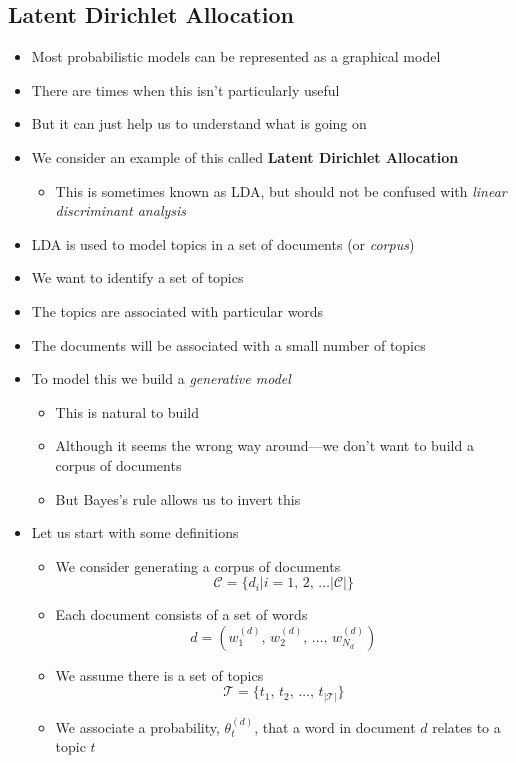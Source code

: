 \documentclass[11pt]{article}
\begin{document}
\subsection{Latent Dirichlet Allocation}
\label{sec:orga2ae2c3}
\begin{itemize}
\item Most probabilistic models can be represented as a graphical model
\item There are times when this isn't particularly useful
\item But it can just help us to understand what is going on
\item We consider an example of this  called \textbf{Latent Dirichlet Allocation}
\begin{itemize}
\item This is sometimes known as LDA, but should not be confused with
\emph{linear discriminant analysis}
\end{itemize}
\item LDA is used to model topics in a set of documents (or \emph{corpus})
\item We want to identify a set of topics
\item The topics are associated with particular words
\item The documents will be associated with a small number of topics
\item To model this we build a \emph{generative model}
\begin{itemize}
\item This is natural to build
\item Although it seems the wrong way around---we don't want to
build a corpus of documents
\item But Bayes's rule allows us to invert this
\end{itemize}
\item Let us start with some definitions
\begin{itemize}
\item We consider generating a corpus of documents
$$ \mathcal{C} = \{d_i | i = 1,\, 2,\, \ldots |\mathcal{C}|\} $$
\item Each document consists of a set of words
$$ d = \left(w_1^{(d)},\, w_2^{(d)},\, \ldots,\,
       w_{N_d}^{(d)}\right) $$
\item We assume there is a set of topics
$$ \mathcal{T}=\{t_1,\,t_2,\,\ldots,\, t_{|\mathcal{T}|}\} $$
\item We associate a probability, \(\theta^{(d)}_t\), that a word in
document \(d\) relates to a topic \(t\)

\end{itemize}
\end{itemize}
\end{document}
